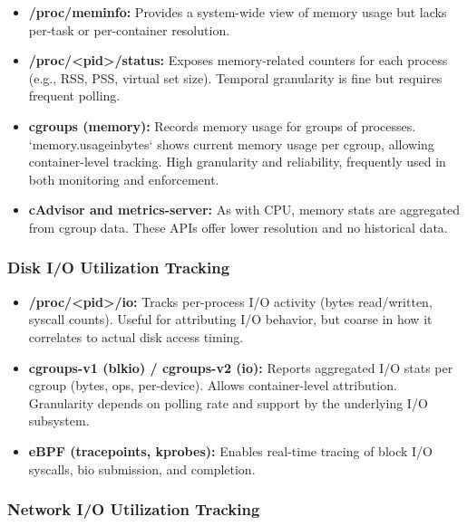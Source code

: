 \begin{itemize}
    \item \textbf{/proc/meminfo:} Provides a system-wide view of memory usage but lacks per-task or per-container resolution.
    \item \textbf{/proc/\textless pid\textgreater/status:} Exposes memory-related counters for each process (e.g., RSS, PSS, virtual set size). Temporal granularity is fine but requires frequent polling.
    \item \textbf{cgroups (memory):} Records memory usage for groups of processes. `memory.usage\textunderscore in\textunderscore bytes` shows current memory usage per cgroup, allowing container-level tracking. High granularity and reliability, frequently used in both monitoring and enforcement.
    \item \textbf{cAdvisor and metrics-server:} As with CPU, memory stats are aggregated from cgroup data. These APIs offer lower resolution and no historical data.
\end{itemize}

\subsubsection*{Disk I/O Utilization Tracking}

\begin{itemize}
    \item \textbf{/proc/\textless pid\textgreater/io:} Tracks per-process I/O activity (bytes read/written, syscall counts). Useful for attributing I/O behavior, but coarse in how it correlates to actual disk access timing.
    \item \textbf{cgroups-v1 (blkio) / cgroups-v2 (io):} Reports aggregated I/O stats per cgroup (bytes, ops, per-device). Allows container-level attribution. Granularity depends on polling rate and support by the underlying I/O subsystem.
    \item \textbf{eBPF (tracepoints, kprobes):} Enables real-time tracing of block I/O syscalls, bio submission, and completion.
\end{itemize}

\subsubsection*{Network I/O Utilization Tracking}


